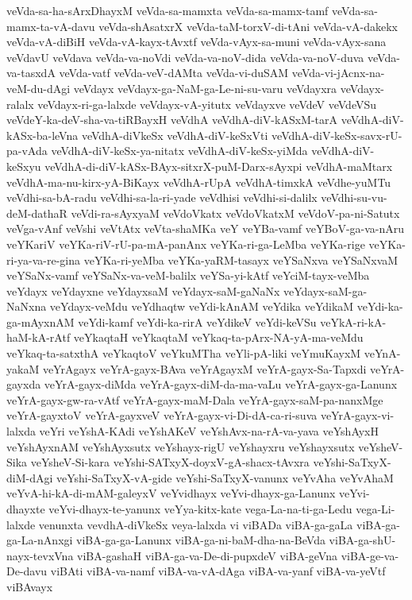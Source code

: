 {veVda-sa-ha-sArxDhayxM
veVda-sa-mamxta
veVda-sa-mamx-tamf
veVda-sa-mamx-ta-vA-davu
veVda-shAsatxrX
veVda-taM-torxV-di-tAni
veVda-vA-dakekx
veVda-vA-diBiH
veVda-vA-kayx-tAvxtf
veVda-vAyx-sa-muni
veVda-vAyx-sana
veVdavU
veVdava
veVda-va-noVdi
veVda-va-noV-dida
veVda-va-noV-duva
veVda-va-tasxdA
veVda-vatf
veVda-veV-dAMta
veVda-vi-duSAM
veVda-vi-jAcnx-na-veM-du-dAgi
veVdayx
veVdayx-ga-NaM-ga-Le-ni-su-varu
veVdayxra
veVdayx-ralalx
veVdayx-ri-ga-lalxde
veVdayx-vA-yitutx
veVdayxve
veVdeV
veVdeVSu
veVdeY-ka-deV-sha-va-tiRBayxH
veVdhA
veVdhA-diV-kASxM-tarA
veVdhA-diV-kASx-ba-leVna
veVdhA-diVkeSx
veVdhA-diV-keSxVti
veVdhA-diV-keSx-savx-rU-pa-vAda
veVdhA-diV-keSx-ya-nitatx
veVdhA-diV-keSx-yiMda
veVdhA-diV-keSxyu
veVdhA-di-diV-kASx-BAyx-sitxrX-puM-Darx-sAyxpi
veVdhA-maMtarx
veVdhA-ma-nu-kirx-yA-BiKayx
veVdhA-rUpA
veVdhA-timxkA
veVdhe-yuMTu
veVdhi-sa-bA-radu
veVdhi-sa-la-ri-yade
veVdhisi
veVdhi-si-dalilx
veVdhi-su-vu-deM-dathaR
veVdi-ra-sAyxyaM
veVdoVkatx
veVdoVkatxM
veVdoV-pa-ni-Satutx
veVga-vAnf
veVshi
veVtAtx
veVta-shaMKa
veY
veYBa-vamf
veYBoV-ga-va-nAru
veYKariV
veYKa-riV-rU-pa-mA-panAnx
veYKa-ri-ga-LeMba
veYKa-rige
veYKa-ri-ya-va-re-gina
veYKa-ri-yeMba
veYKa-yaRM-tasayx
veYSaNxva
veYSaNxvaM
veYSaNx-vamf
veYSaNx-va-veM-balilx
veYSa-yi-kAtf
veYciM-tayx-veMba
veYdayx
veYdayxne
veYdayxsaM
veYdayx-saM-gaNaNx
veYdayx-saM-ga-NaNxna
veYdayx-veMdu
veYdhaqtw
veYdi-kAnAM
veYdika
veYdikaM
veYdi-ka-ga-mAyxnAM
veYdi-kamf
veYdi-ka-rirA
veYdikeV
veYdi-keVSu
veYkA-ri-kA-haM-kA-rAtf
veYkaqtaH
veYkaqtaM
veYkaq-ta-pArx-NA-yA-ma-veMdu
veYkaq-ta-satxthA
veYkaqtoV
veYkuMTha
veYli-pA-liki
veYmuKayxM
veYnA-yakaM
veYrAgayx
veYrA-gayx-BAva
veYrAgayxM
veYrA-gayx-Sa-Tapxdi
veYrA-gayxda
veYrA-gayx-diMda
veYrA-gayx-diM-da-ma-vaLu
veYrA-gayx-ga-Lanunx
veYrA-gayx-gw-ra-vAtf
veYrA-gayx-maM-Dala
veYrA-gayx-saM-pa-nanxMge
veYrA-gayxtoV
veYrA-gayxveV
veYrA-gayx-vi-Di-dA-ca-ri-suva
veYrA-gayx-vi-lalxda
veYri
veYshA-KAdi
veYshAKeV
veYshAvx-na-rA-va-yava
veYshAyxH
veYshAyxnAM
veYshAyxsutx
veYshayx-rigU
veYshayxru
veYshayxsutx
veYsheV-Sika
veYsheV-Si-kara
veYshi-SATxyX-doyxV-gA-shacx-tAvxra
veYshi-SaTxyX-diM-dAgi
veYshi-SaTxyX-vA-gide
veYshi-SaTxyX-vanunx
veYvAha
veYvAhaM
veYvA-hi-kA-di-mAM-galeyxV
veYvidhayx
veYvi-dhayx-ga-Lanunx
veYvi-dhayxte
veYvi-dhayx-te-yanunx
veYya-kitx-kate
vega-La-na-ti-ga-Ledu
vega-Li-lalxde
venunxta
vevdhA-diVkeSx
veya-lalxda
vi
viBADa
viBA-ga-gaLa
viBA-ga-ga-La-nAnxgi
viBA-ga-ga-Lanunx
viBA-ga-ni-baM-dha-na-BeVda
viBA-ga-shU-nayx-tevxVna
viBA-gashaH
viBA-ga-va-De-di-pupxdeV
viBA-geVna
viBA-ge-va-De-davu
viBAti
viBA-va-namf
viBA-va-vA-dAga
viBA-va-yanf
viBA-va-yeVtf
viBAvayx
}
